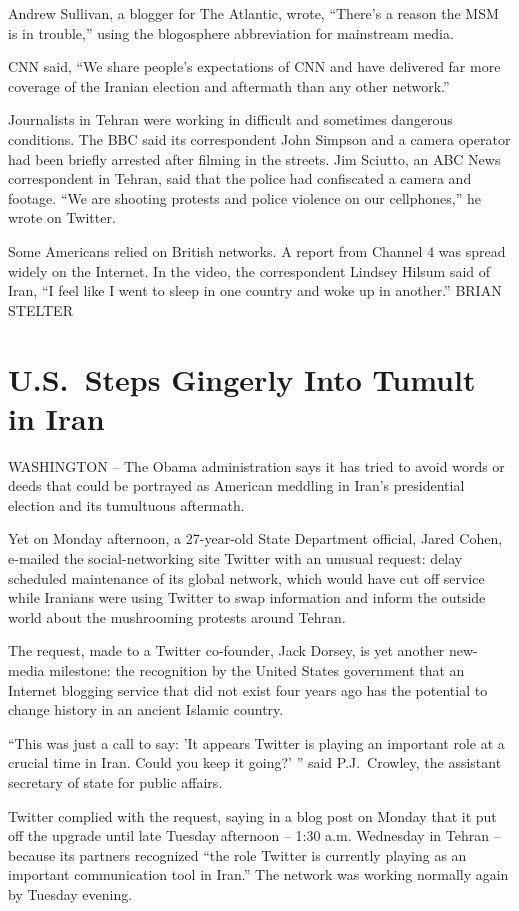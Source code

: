 ﻿\documentclass[12pt,a4paper,onecolumn]{article}
\begin{document}
Andrew Sullivan, a blogger for The Atlantic, wrote, ``There's a reason the MSM is in trouble,''
using the blogosphere abbreviation for mainstream media.

CNN said, ``We share people's expectations of CNN and have delivered far more coverage of the
Iranian election and aftermath than any other network.''

Journalists in Tehran were working in difficult and sometimes dangerous conditions. The BBC said its
correspondent John Simpson and a camera operator had been briefly arrested after filming in the
streets. Jim Sciutto, an ABC News correspondent in Tehran, said that the police had confiscated a
camera and footage. ``We are shooting protests and police violence on our cellphones,'' he wrote on
Twitter.

Some Americans relied on British networks. A report from Channel 4 was spread widely on the
Internet. In the video, the correspondent Lindsey Hilsum said of Iran, ``I feel like I went to sleep
in one country and woke up in another.'' BRIAN STELTER

\section{U.S.~Steps Gingerly Into Tumult in Iran}

WASHINGTON -- The Obama administration says it has tried to avoid words or deeds that could be
portrayed as American meddling in Iran's presidential election and its tumultuous aftermath.

Yet on Monday afternoon, a 27-year-old State Department official, Jared Cohen, e-mailed the
social-networking site Twitter with an unusual request: delay scheduled maintenance of its global
network, which would have cut off service while Iranians were using Twitter to swap information and
inform the outside world about the mushrooming protests around Tehran.

The request, made to a Twitter co-founder, Jack Dorsey, is yet another new-media milestone: the
recognition by the United States government that an Internet blogging service that did not exist
four years ago has the potential to change history in an ancient Islamic country.

``This was just a call to say: 'It appears Twitter is playing an important role at a crucial time in
Iran. Could you keep it going?' '' said P.J.~Crowley, the assistant secretary of state for public
affairs.

Twitter complied with the request, saying in a blog post on Monday that it put off the upgrade until
late Tuesday afternoon -- 1:30 a.m. Wednesday in Tehran -- because its partners recognized ``the
role Twitter is currently playing as an important communication tool in Iran.'' The network was
working normally again by Tuesday evening.
\end{document}
